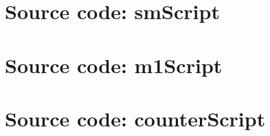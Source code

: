 \documentclass{report}
\begin{document}
\appendix{}

\chapter{Source code: smScript}
\label{cha:source-code-1}


\chapter{Source code: m1Script}
\label{cha:source-code-2}


\chapter{Source code: counterScript}
\label{cha:source-code-3}

\end{document}
